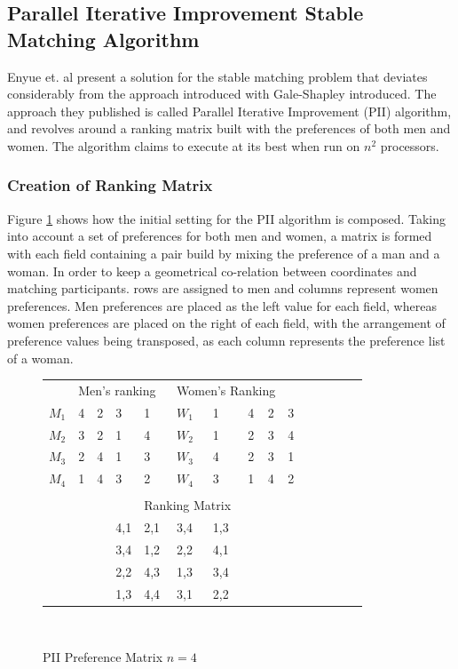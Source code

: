 \subsection{Parallel Iterative Improvement Stable Matching Algorithm} Enyue et. al\cite{PII} present a solution for the stable matching problem that deviates considerably from the approach introduced with Gale-Shapley introduced. The approach they published is called Parallel Iterative Improvement (PII) algorithm, and revolves around a ranking matrix built with the preferences of both men and women. The algorithm claims to execute at its best when run on $n^2$ processors.
\subsubsection{Creation of Ranking Matrix}
Figure \ref{fig:PII Ranking Matrix} shows how the initial setting for the PII algorithm is composed. Taking into account a set of preferences for both men and women, a matrix is formed with each field containing a pair build by mixing the preference of a man and a woman. In order to keep a geometrical co-relation between coordinates and matching participants. rows are assigned to men and columns represent women preferences. Men preferences are placed as the left value for each field, whereas women preferences are placed on the right of each field, with the arrangement of preference values being transposed, as each column represents the preference list of a woman.

\begin{figure}[!ht]
    \centering

    \begin{tabular}{lllllllllllllll}
   & \multicolumn{4}{l}{Men's ranking} &  \multicolumn{4}{l}{Women's Ranking}\\
$M_1$ & 4    & 2    & 3    & 1    & $W_1$ & 1     & 4     & 2   & 3 \\
$M_2$ & 3    & 2    & 1    & 4    & $W_2$ & 1     & 2     & 3   & 4  \\
$M_3$ & 2    & 4    & 1    & 3   & $W_3$ & 4     & 2     & 3     & 1  \\
$M_4$ & 1    & 4    & 3    & 2    & $W_4$ & 3     & 1     & 4     & 2 \\
\\

& & &&\multicolumn{3}{l}{Ranking Matrix}\\
 & & & 4,1 & 2,1 & 3,4 & 1,3\\
 &&& 3,4 & 1,2 & 2,2 & 4,1\\
 &&& 2,2 & 4,3 & 1,3 & 3,4\\
 &&& 1,3 & 4,4 & 3,1 & 2,2\\
\end{tabular}\\

    \caption{PII Preference Matrix $n=4$}
    \label{fig:PII Ranking Matrix}
\end{figure}

